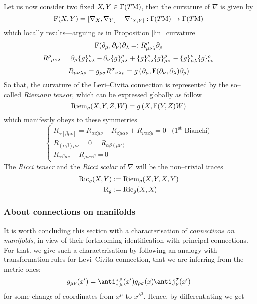Let us now consider two fixed $X,Y\in\Gamma(T\M)$, then the curvature of $\nabla$ is given by
$$\F(X,Y)=[\nabla_X,\nabla_Y]-\nabla_{[X,Y]}:\Gamma(T\M)\to\Gamma(T\M)$$
which locally results---arguing as in Proposition \ref{lin_curvature}
$$\F(\der_\mu,\der_\nu)\der_\lambda=:R_{\mu\nu\lambda}^\rho\der_\rho$$
$${R^\rho}_{\mu\nu\lambda}=\der_\mu\{g\}_{\nu\lambda}^\rho-\der_\nu\{g\}_{\mu\lambda}^\rho+\{g\}_{\nu\lambda}^\rho\{g\}^\rho_{\mu\sigma}-\{g\}^\rho_{\mu\lambda}\{g\}^\rho_{\nu\sigma}$$
$$R_{\mu\nu\lambda\rho}=g_{\mu\sigma}{R^\sigma}_{\nu\lambda\rho}=g\left(\der_\mu,\F(\der_\nu,\der_\lambda)\der_\rho\right)$$
So that, the curvature of the Levi--Civita connection is represented by the so--called \emph{Riemann tensor}, which can be expressed globally as follow 
$$\Riem_g(X,Y,Z,W)=g\left(X,\F(Y,Z)W\right)$$
which manifestly obeys to these symmetries
$$\begin{cases}
     
    R_{\alpha[\beta\mu\nu]}=R_{\alpha\beta\mu\nu}+R_{\beta\mu\alpha\nu}+R_{\nu\alpha\beta\mu}=0&(1^{\text{st}}\,\,\text{Bianchi)}\\
    R_{(\alpha\beta)\mu\nu}=0=R_{\alpha\beta(\mu\nu)}\\ 
    R_{\alpha\beta\mu\nu}-R_{\mu\nu\alpha\beta}=0
\end{cases}$$
The \emph{Ricci tensor} and the \emph{Ricci scalar} of $\nabla$ will be the non--trivial traces
\begin{align*}
\Ric_g(X,Y)&:=\Riem_g(X,Y,X,Y)\\
\Scal_g&:=\Ric_g(X,X)
\end{align*}

\subsubsection{About connections on manifolds}\label{connections_on_manifolds}
It is worth concluding this section with a characterisation of \emph{connections on manifolds}, in view of their forthcoming identification with principal connections. For that, we give such a characterisation by following an analogy with transformation rules for Levi--Civita connection, that we are inferring from the metric ones:
$$g_{\mu\nu}(x')=\antij^\rho_\mu(x')g_{\rho\sigma}(x)\antij^\sigma_\nu(x')$$
for some change of coordinates from $x^\mu$ to ${x'}^\mu$. Hence, by differentiating we get


